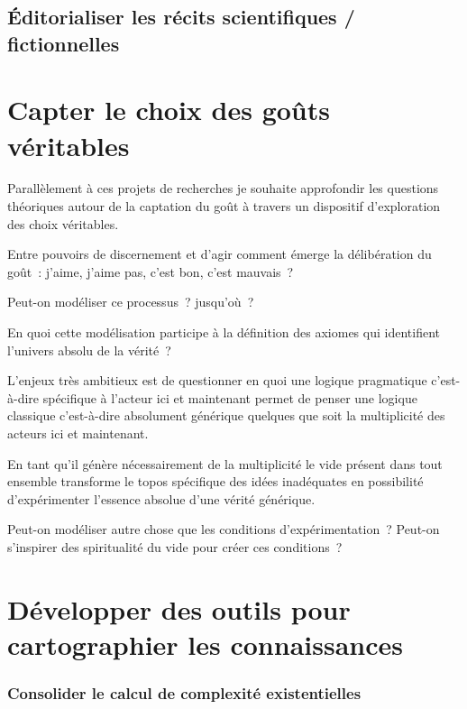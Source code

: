 \documentclass[
  letterpaper,
  DIV=11,
  numbers=noendperiod]{scrreprt}
\begin{document}
\hypertarget{uxe9ditorialiser-les-ruxe9cits-scientifiques-fictionnelles}{%
\section{Éditorialiser les récits scientifiques /
fictionnelles}\label{uxe9ditorialiser-les-ruxe9cits-scientifiques-fictionnelles}}

\hypertarget{sec-capterGout}{%
\chapter{Capter le choix des goûts véritables}\label{sec-capterGout}}

Parallèlement à ces projets de recherches je souhaite approfondir les
questions théoriques autour de la captation du goût à travers un
dispositif d'exploration des choix véritables.

Entre pouvoirs de discernement et d'agir comment émerge la délibération
du goût~: j'aime, j'aime pas, c'est bon, c'est mauvais~?

Peut-on modéliser ce processus~? jusqu'où~?

En quoi cette modélisation participe à la définition des axiomes qui
identifient l'univers absolu de la vérité~?

L'enjeux très ambitieux est de questionner en quoi une logique
pragmatique c'est-à-dire spécifique à l'acteur ici et maintenant permet
de penser une logique classique c'est-à-dire absolument générique
quelques que soit la multiplicité des acteurs ici et maintenant.

En tant qu'il génère nécessairement de la multiplicité le vide présent
dans tout ensemble transforme le topos spécifique des idées inadéquates
en possibilité d'expérimenter l'essence absolue d'une vérité générique.

Peut-on modéliser autre chose que les conditions d'expérimentation~?
Peut-on s'inspirer des spiritualité du vide pour créer ces conditions~?

\hypertarget{sec-developper}{%
\chapter{Développer des outils pour cartographier les
connaissances}\label{sec-developper}}

\hypertarget{consolider-le-calcul-de-complexituxe9-existentielles}{%
\subsection{Consolider le calcul de complexité
existentielles}\label{consolider-le-calcul-de-complexituxe9-existentielles}}
\end{document}
